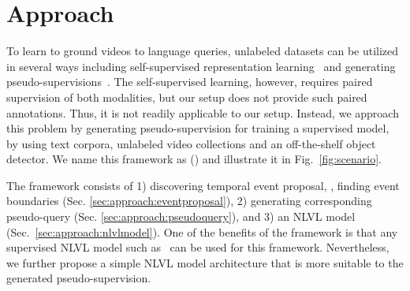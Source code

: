 \section{Approach}


To learn to ground videos to language queries, unlabeled datasets can be utilized in several ways including self-supervised representation learning~\cite{actbert,videobert} and generating pseudo-supervisions~\cite{lin-etal-2020-semi,Feng2019UnsupervisedIC}.
The self-supervised learning, however, requires paired supervision of both modalities, but our setup does not provide such paired annotations.
Thus, it is not readily applicable to our setup. 
Instead, we approach this problem by generating pseudo-supervision for training a supervised model, by using text corpora, unlabeled video collections and an off-the-shelf object detector.
We name this framework as \emph{\methodfull} ({\method}) and illustrate it in Fig.~\ref{fig:scenario}.

The framework consists of 1) discovering temporal event proposal, \ie, finding event boundaries (Sec. \ref{sec:approach:eventproposal}), 2) generating corresponding pseudo-query (Sec. \ref{sec:approach:pseudoquery}), and 3) an NLVL model (Sec.~\ref{sec:approach:nlvlmodel}). 
One of the benefits of the framework is that any supervised NLVL model such as~\cite{mun2020LGI} can be used for this framework.
Nevertheless, we further propose a simple NLVL model architecture that is more suitable to the generated pseudo-supervision.



